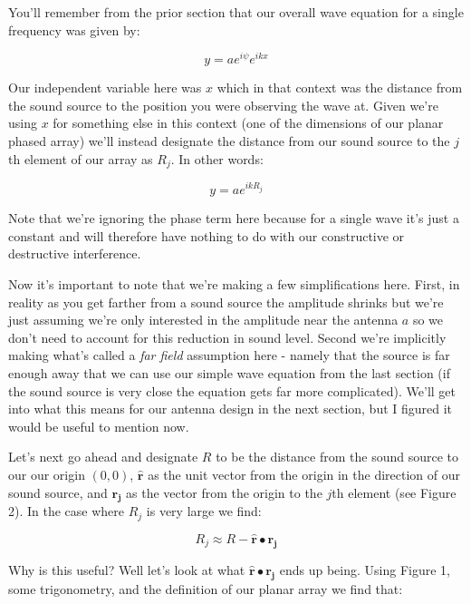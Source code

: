 \documentclass[12pt,a6paper]{book}
\begin{document}
You'll remember from the prior section that our overall wave equation for a single frequency was given by:

\begin{equation}
y = a e^{i\psi}e^{ikx}
\end{equation}

Our independent variable here was $x$ which in that context was the distance from the sound source to the position you were observing the wave at. Given we're using $x$ for something else in this context (one of the dimensions of our planar phased array) we'll instead designate the distance from our sound source to the $j$th element of our array as $R_j$. In other words:


\begin{equation}
y = a e^{ikR_j}
\end{equation}

Note that we're ignoring the phase term here because for a single wave it's just a constant and will therefore have nothing to do with our constructive or destructive interference. 

Now it's important to note that we're making a  few simplifications here. First, in reality as you get farther from a sound source the amplitude shrinks but we're just assuming we're only interested in the amplitude near the antenna $a$ so we don't need to account for this reduction in sound level. Second we're implicitly making what's called a \textit{far field} assumption here - namely that the source is far enough away that we can use our simple wave equation from the last section (if the sound source is very close the equation gets far more complicated). We'll get into what this means for our antenna design in the next section, but I figured it would be useful to mention now. 

Let's next go ahead and designate $R$ to be the distance from the sound source to our our origin $(0,0)$, $\mathbf{\hat{r}}$ as the unit vector from the origin in the direction of our sound source, and $\mathbf{r_j}$ as the vector from the origin to the $j$th element (see Figure 2). In the case where $R_j$ is very large we find:

\begin{equation}
R_j \approx R - \mathbf{\hat{r}}\bullet\mathbf{r_j}
\end{equation}

Why is this useful? Well let's look at what $\mathbf{\hat{r}}\bullet\mathbf{r_j}$ ends up being. Using Figure 1, some trigonometry, and the definition of our planar array we find that:
\end{document}
